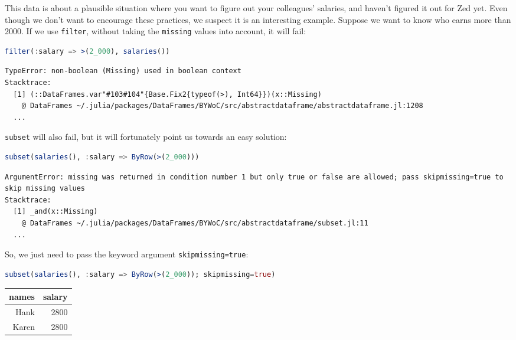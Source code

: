 \documentclass[
  notoc %
]{tufte-book}
\newcommand{\passthrough}[1]{#1}
\begin{document}
This data is about a plausible situation where you want to figure out
your colleagues' salaries, and haven't figured it out for Zed yet. Even
though we don't want to encourage these practices, we suspect it is an
interesting example. Suppose we want to know who earns more than 2000.
If we use \passthrough{\lstinline!filter!}, without taking the
\passthrough{\lstinline!missing!} values into account, it will fail:

\begin{lstlisting}[language=Julia]
filter(:salary => >(2_000), salaries())
\end{lstlisting}

\begin{lstlisting}[language=Output]
TypeError: non-boolean (Missing) used in boolean context
Stacktrace:
  [1] (::DataFrames.var"#103#104"{Base.Fix2{typeof(>), Int64}})(x::Missing)
    @ DataFrames ~/.julia/packages/DataFrames/BYWoC/src/abstractdataframe/abstractdataframe.jl:1208
  ...
\end{lstlisting}

\passthrough{\lstinline!subset!} will also fail, but it will fortunately
point us towards an easy solution:

\begin{lstlisting}[language=Julia]
subset(salaries(), :salary => ByRow(>(2_000)))
\end{lstlisting}

\begin{lstlisting}[language=Output]
ArgumentError: missing was returned in condition number 1 but only true or false are allowed; pass skipmissing=true to skip missing values
Stacktrace:
  [1] _and(x::Missing)
    @ DataFrames ~/.julia/packages/DataFrames/BYWoC/src/abstractdataframe/subset.jl:11
  ...
\end{lstlisting}

So, we just need to pass the keyword argument
\passthrough{\lstinline!skipmissing=true!}:

\begin{lstlisting}[language=Julia]
subset(salaries(), :salary => ByRow(>(2_000)); skipmissing=true)
\end{lstlisting}

\begin{longtable}[]{@{}rr@{}}
\toprule
names & salary \\
\midrule
\endhead
Hank & 2800 \\
Karen & 2800 \\
\bottomrule
\end{longtable}
\end{document}
